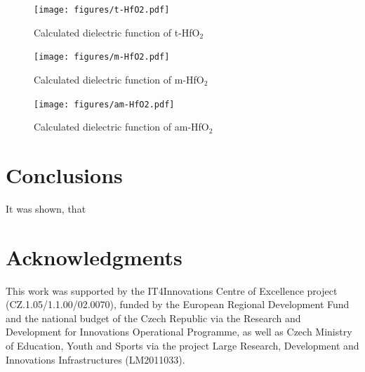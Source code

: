 \documentclass[10pt,a4paper,twocolumn]{article}
\begin{document}
\begin{figure}
\begin{center}
	\texttt{[image: figures/t-HfO2.pdf]}
	\caption{Calculated dielectric function of t-HfO$_2$}
   \label{eps-tHfO2}
\end{center}
\end{figure}

\begin{figure}
\begin{center}
	\texttt{[image: figures/m-HfO2.pdf]}
	\caption{Calculated dielectric function of m-HfO$_2$}
   \label{eps-mHfO2}
\end{center}
\end{figure}

\begin{figure}
\begin{center}
	\texttt{[image: figures/am-HfO2.pdf]}
	\caption{Calculated dielectric function of am-HfO$_2$}
   \label{eps-amHfO2}
\end{center}
\end{figure}


\section{Conclusions}

It was shown, that

\section*{Acknowledgments}
This work was supported by the IT4Innovations Centre of Excellence project (CZ.1.05/1.1.00/02.0070), funded by the European Regional Development Fund and the national budget of the Czech Republic via the Research and Development for Innovations Operational Programme, as well as Czech Ministry of Education, Youth and Sports via the project Large Research, Development and Innovations Infrastructures (LM2011033).



\end{document}
